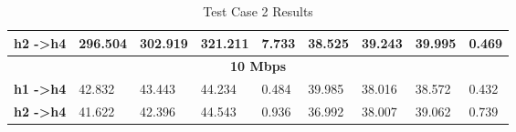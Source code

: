 \begin{table}[h!]
\begin{tabular}{l|l|l|l|l|l|l|l|l|}
\multicolumn{1}{|l|}{\textbf{h2 -\textgreater h4}} & 296.504                           & 302.919                           & 321.211                           & 7.733                              & 38.525                            & 39.243                            & 39.995                            & 0.469                              \\ \hline
\multicolumn{9}{|c|}{\textbf{10 Mbps}}                                                                                                                                                                                                                                                                                                               \\ \hline
\multicolumn{1}{|l|}{\textbf{h1 -\textgreater h4}} & 42.832                            & 43.443                            & 44.234                            & 0.484                              & 39.985                            & 38.016                            & 38.572                            & 0.432                              \\ \hline
\multicolumn{1}{|l|}{\textbf{h2 -\textgreater h4}} & 41.622                            & 42.396                            & 44.543                            & 0.936                              & 36.992                            & 38.007                            & 39.062                            & 0.739                              \\ \hline
\end{tabular}
\caption{Test Case 2 Results}
\label{table:test2}
\end{table}

